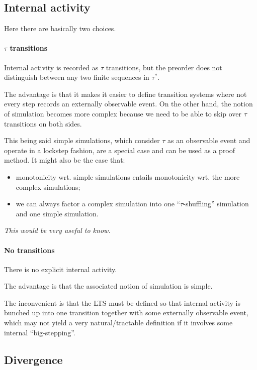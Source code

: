 \documentclass[11pt]{article}
\begin{document}

\subsection{Internal activity} %

Here there are basically two choices.

\paragraph{$\tau$ transitions}

Internal activity is recorded as $\tau$ transitions,
but the preorder does not distinguish
between any two finite sequences in $\tau^*$.

The advantage is that it makes it easier to define
transition systems where not every step
records an externally observable event.
On the other hand,
the notion of simulation becomes more complex
because we need to be able to skip over
$\tau$ transitions on both sides.

This being said simple simulations,
which consider $\tau$ as an observable event
and operate in a lockstep fashion,
are a special case and can be used as a proof method.
It might also be the case that:
\begin{itemize}
  \item monotonicity wrt. simple simulations
    entails monotonicity wrt. the more complex simulations;
  \item we can always factor a complex simulation into
    one ``$\tau$-shuffling'' simulation and
    one simple simulation.
\end{itemize}
\emph{This would be very useful to know.}

\paragraph{No transitions}

There is no explicit internal activity.

The advantage is that
the associated notion of simulation is simple.

The inconvenient is that
the LTS must be defined so that
internal activity is bunched up into one transition
together with some externally observable event,
which may not yield a very natural/tractable definition
if it involves some internal ``big-stepping''.


\subsection{Divergence} %
\end{document}
